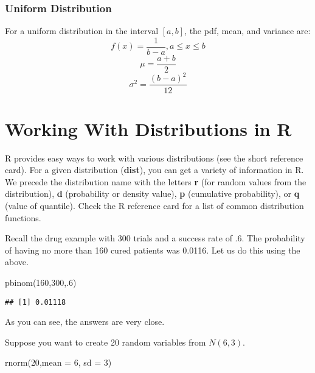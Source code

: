 \documentclass[
]{article}
\newenvironment{Shaded}{\begin{snugshade}}{\end{snugshade}}
\newcommand{\AttributeTok}[1]{\textcolor[rgb]{0.77,0.63,0.00}{#1}}
\newcommand{\DecValTok}[1]{\textcolor[rgb]{0.00,0.00,0.81}{#1}}
\newcommand{\FunctionTok}[1]{\textcolor[rgb]{0.00,0.00,0.00}{#1}}
\newcommand{\NormalTok}[1]{#1}
\begin{document}
\hypertarget{uniform-distribution}{%
\subsubsection{Uniform Distribution}\label{uniform-distribution}}

For a uniform distribution in the interval \([a,b]\), the pdf, mean, and
variance are: \[f(x) = \frac{1}{b-a}, a\le x \le b\]
\[\mu = \frac{a+b}{2}\] \[\sigma^2 = \frac{(b-a)^2}{12}\]

\hypertarget{working-with-distributions-in-r}{%
\section{Working With Distributions in
R}\label{working-with-distributions-in-r}}

R provides easy ways to work with various distributions (see the short
reference card). For a given distribution (\textbf{dist}), you can get a
variety of information in R. We precede the distribution name with the
letters \textbf{r} (for random values from the distribution), \textbf{d}
(probability or density value), \textbf{p} (cumulative probability), or
\textbf{q} (value of quantile). Check the R reference card for a list of
common distribution functions.

Recall the drug example with 300 trials and a success rate of .6. The
probability of having no more than 160 cured patients was 0.0116. Let us
do this using the above.

\begin{Shaded}
\begin{Highlighting}[]
\FunctionTok{pbinom}\NormalTok{(}\DecValTok{160}\NormalTok{,}\DecValTok{300}\NormalTok{,.}\DecValTok{6}\NormalTok{)}
\end{Highlighting}
\end{Shaded}

\begin{verbatim}
## [1] 0.01118
\end{verbatim}

As you can see, the answers are very close.

Suppose you want to create 20 random variables from \(N(6,3)\).

\begin{Shaded}
\begin{Highlighting}[]
\FunctionTok{rnorm}\NormalTok{(}\DecValTok{20}\NormalTok{,}\AttributeTok{mean =} \DecValTok{6}\NormalTok{, }\AttributeTok{sd =} \DecValTok{3}\NormalTok{)}
\end{Highlighting}
\end{Shaded}
\end{document}
